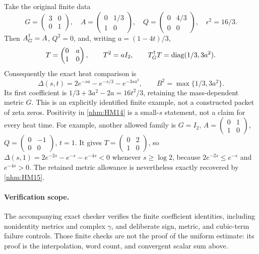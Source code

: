 Take the original finite data
\begin{equation}
 G=\begin{pmatrix}3&0\\0&1\end{pmatrix},\quad
 A=\begin{pmatrix}0&1/3\\1&0\end{pmatrix},\quad
 Q=\begin{pmatrix}0&4/3\\0&0\end{pmatrix},\quad
 \epsilon^2=16/3.
 \tag{HM18}\label{nhm:HM18}
\end{equation}
Then \(A^\dagger_G=A\), \(Q^2=0\), and, writing \(a=(1-4t)/3\),
\[
 T=\begin{pmatrix}0&a\\1&0\end{pmatrix},\qquad
 T^2=aI_2,\qquad T^\dagger_G T=\operatorname{diag}(1/3,3a^2).
\]
Consequently the exact heat comparison is
\begin{equation}
 \Delta(s,t)=2e^{-sa}-e^{-s/3}-e^{-3sa^2},\qquad
 B^2=\max\{1/3,3a^2\}.
 \tag{HM19}\label{nhm:HM19}
\end{equation}
Its first coefficient is
\(1/3+3a^2-2a=16t^2/3\), retaining the mass-dependent metric \(G\).
This is an explicitly identified finite example, not a constructed packet
of zeta zeros. Positivity in \eqref{nhm:HM14} is a small-\(s\) statement, not
a claim for every heat time. For example, another allowed family is
\(G=I_2\), \(A=\left(\begin{smallmatrix}0&1\\1&0\end{smallmatrix}\right)\),
\(Q=\left(\begin{smallmatrix}0&-1\\0&0\end{smallmatrix}\right)\), \(t=1\).
It gives \(T=\left(\begin{smallmatrix}0&2\\1&0\end{smallmatrix}\right)\),
so \(\Delta(s,1)=2e^{-2s}-e^{-s}-e^{-4s}<0\) whenever \(s\ge\log 2\),
because \(2e^{-2s}\le e^{-s}\) and \(e^{-4s}>0\).
The retained metric allowance is nevertheless exactly recovered by
\eqref{nhm:HM15}.

\paragraph{Verification scope.}
The accompanying exact checker verifies the finite coefficient identities,
including nonidentity metrics and complex \(\gamma\), and deliberate
sign, metric, and cubic-term failure controls. Those finite checks are
not the proof of the uniform estimate: its proof is the interpolation,
word count, and convergent scalar sum above.

